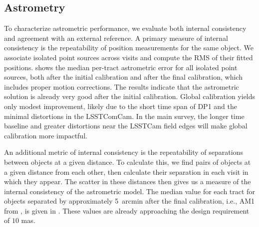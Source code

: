 \subsection{Astrometry}
To characterize astrometric performance, we evaluate both internal consistency and agreement with an external reference.
A primary measure of internal consistency is the repeatability of position measurements for the same object. We associate isolated point sources across visits and compute the RMS of their fitted positions.
 shows the median per-tract astrometric error for all isolated point sources, both after the initial calibration and after the final calibration, which includes proper motion corrections. 
The results indicate that the astrometric solution is already very good after the initial calibration. 
Global calibration yields only modest improvement, likely due to the short time span of DP1 and the minimal distortions in the LSSTComCam. 
In the main survey, the longer time baseline and greater distortions near the LSSTCam field edges will make global calibration more impactful.

An additional metric of internal consistency is the repeatability of separations between objects at a given distance.
To calculate this, we find pairs of objects at a given distance from each other, then calculate their separation in each visit in which they appear.
The scatter in these distances then gives us a measure of the internal consistency of the astrometric model.
The median value for each tract for objects separated by approximately 5~arcmin after the final calibration, i.e., AM1 from \citet{LPM-17}, is given in .
These values are already approaching the design requirement of $10$ mas.

